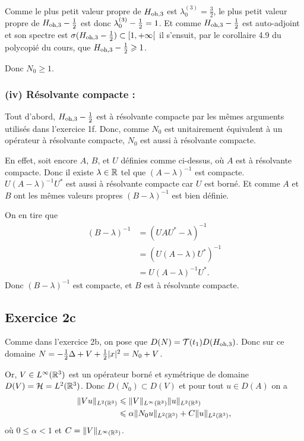 Comme le plus petit valeur propre de $H_\text{oh,3}$ est
$\lambda_0^{(3)} = \frac{3}{2}$, le plus petit valeur propre de
$H_\text{oh,3} - \frac{1}{2}$ est donc $\lambda_0^{(3)} - \frac{1}{2} = 1$.
Et comme $H_\text{oh,3} - \frac{1}{2}$ est auto-adjoint et son spectre est
$\sigma(H_\text{oh,3} - \frac{1}{2}) \subset [1, +\infty[$
il s'ensuit, par le corollaire 4.9 du polycopié du cours,
que $H_\text{oh,3} - \frac{1}{2} \geqslant 1$.

Donc $N_0 \geqslant 1$.

\subsubsection*{(iv) Résolvante compacte :}

Tout d'abord, $H_\text{oh,3} - \frac{1}{2}$ est à résolvante compacte par
les mêmes arguments utilisés dans l'exercice 1f. Donc, comme
$N_0$ est unitairement équivalent à un opérateur à résolvante compacte,
$N_0$ est aussi à résolvante compacte.

En effet, soit encore $A$, $B$, et $U$ définies comme ci-dessus,
où $A$ est à résolvante compacte. Donc
il existe $\lambda \in \mathbb{R}$ tel que $(A - \lambda)^{-1}$ est
compacte. $U (A -\lambda)^{-1} U^*$
est aussi à résolvante compacte car $U$ est borné.
Et comme $A$ et $B$ ont les mêmes valeurs propres
$(B - \lambda)^{-1}$ est bien définie.

On en tire que
\begin{align}
    (B - \lambda)^{-1} &= (UAU^* - \lambda)^{-1} \\
    &= (U(A - \lambda) U^*)^{-1} \\
    &= U (A - \lambda)^{-1} U^*.
\end{align}
%
Donc $(B - \lambda)^{-1}$ est compacte, et $B$ est
à résolvante compacte.


\subsection*{Exercice 2c}

Comme dans l'exercice 2b, on pose que $D(N) = \mathcal{T}(t_1) D(H_\text{oh,3})$.
Donc sur ce domaine $N = -\frac{1}{2} \Delta + V + \frac{1}{2} |x|^2 = N_0 + V$.

Or, $V \in L^\infty(\mathbb{R}^3)$ est un opérateur
borné et symétrique de domaine $D(V) = \mathcal{H} = L^2(\mathbb{R}^3)$.
Donc $D(N_0) \subset D(V)$ et pour tout $u \in D(A)$ on a
\begin{align}
    \| Vu \|_{L^2(\mathbb{R}^3)} & \leqslant \| V \|_{L^\infty(\mathbb{R}^3)}\| u \|_{L^2(\mathbb{R}^3)} \\
    & \leqslant \alpha \| N_0 u \|_{L^2(\mathbb{R}^3)} + C\| u \|_{L^2(\mathbb{R}^3)},
\end{align}
où $0 \leqslant \alpha < 1$ et $C = \| V \|_{L^\infty(\mathbb{R}^3)}$.

